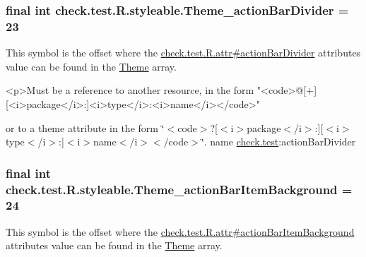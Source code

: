 \subsubsection[{Theme\+\_\+action\+Bar\+Divider}]{\setlength{\rightskip}{0pt plus 5cm}final int check.\+test.\+R.\+styleable.\+Theme\+\_\+action\+Bar\+Divider = 23\hspace{0.3cm}{\ttfamily [static]}}\label{classcheck_1_1test_1_1_r_1_1styleable_a24a4a7345478079d2842c3c6b948cee8}
This symbol is the offset where the \hyperlink{classcheck_1_1test_1_1_r_1_1attr_a231d531e25674903c0fc051027b53e1f}{check.\+test.\+R.\+attr\#action\+Bar\+Divider} attribute\textquotesingle{}s value can be found in the \hyperlink{classcheck_1_1test_1_1_r_1_1styleable_acca726d02016a0cf607782ec3a436a81}{Theme} array.

\begin{DoxyVerb}      <p>Must be a reference to another resource, in the form "<code>@[+][<i>package</i>:]<i>type</i>:<i>name</i></code>"
\end{DoxyVerb}
 or to a theme attribute in the form \char`\"{}$<$code$>$?\mbox{[}$<$i$>$package$<$/i$>$\+:\mbox{]}\mbox{[}$<$i$>$type$<$/i$>$\+:\mbox{]}$<$i$>$name$<$/i$>$$<$/code$>$\char`\"{}.  name \hyperlink{namespacecheck_1_1test}{check.\+test}\+:action\+Bar\+Divider \hypertarget{classcheck_1_1test_1_1_r_1_1styleable_a0452c18018a280bc2c98c290c760c4de}{}
\subsubsection[{Theme\+\_\+action\+Bar\+Item\+Background}]{\setlength{\rightskip}{0pt plus 5cm}final int check.\+test.\+R.\+styleable.\+Theme\+\_\+action\+Bar\+Item\+Background = 24\hspace{0.3cm}{\ttfamily [static]}}\label{classcheck_1_1test_1_1_r_1_1styleable_a0452c18018a280bc2c98c290c760c4de}
This symbol is the offset where the \hyperlink{classcheck_1_1test_1_1_r_1_1attr_a11f2699ca7c3187bf87d25f5d33e1237}{check.\+test.\+R.\+attr\#action\+Bar\+Item\+Background} attribute\textquotesingle{}s value can be found in the \hyperlink{classcheck_1_1test_1_1_r_1_1styleable_acca726d02016a0cf607782ec3a436a81}{Theme} array.

